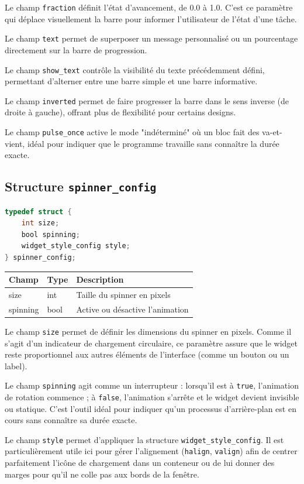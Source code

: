 Le champ \texttt{fraction} définit l'état d'avancement, de 0.0 à 1.0. C'est ce paramètre qui déplace visuellement la barre pour informer l'utilisateur de l'état d'une tâche.

Le champ \texttt{text} permet de superposer un message personnalisé ou un pourcentage directement sur la barre de progression.

Le champ \texttt{show\_text} contrôle la visibilité du texte précédemment défini, permettant d'alterner entre une barre simple et une barre informative.

Le champ \texttt{inverted} permet de faire progresser la barre dans le sens inverse (de droite à gauche), offrant plus de flexibilité pour certains designs.

Le champ \texttt{pulse\_once} active le mode "indéterminé" où un bloc fait des va-et-vient, idéal pour indiquer que le programme travaille sans connaître la durée exacte.

\subsection{Structure \texttt{spinner\_config}}
\begin{lstlisting}[language=C]
typedef struct {
    int size;
    bool spinning;
    widget_style_config style;
} spinner_config;
\end{lstlisting}
\begin{center}
\begin{tabular}{|l|l|>{\raggedright\arraybackslash}p{6cm}|}
\hline
\textbf{Champ} & \textbf{Type} & \textbf{Description} \\
\hline
size & int & Taille du spinner en pixels \\
\hline
spinning & bool & Active ou désactive l'animation \\
\hline
\end{tabular}
\end{center}

\bigskip

Le champ \texttt{size} permet de définir les dimensions du spinner en pixels. Comme il s'agit d'un indicateur de chargement circulaire, ce paramètre assure que le widget reste proportionnel aux autres éléments de l'interface (comme un bouton ou un label).

Le champ \texttt{spinning} agit comme un interrupteur : lorsqu'il est à \texttt{true}, l'animation de rotation commence ; à \texttt{false}, l'animation s'arrête et le widget devient invisible ou statique. C'est l'outil idéal pour indiquer qu'un processus d'arrière-plan est en cours sans connaître sa durée exacte.

Le champ \texttt{style} permet d'appliquer la structure \texttt{widget\_style\_config}. Il est particulièrement utile ici pour gérer l'alignement (\texttt{halign}, \texttt{valign}) afin de centrer parfaitement l'icône de chargement dans un conteneur ou de lui donner des marges pour qu'il ne colle pas aux bords de la fenêtre.